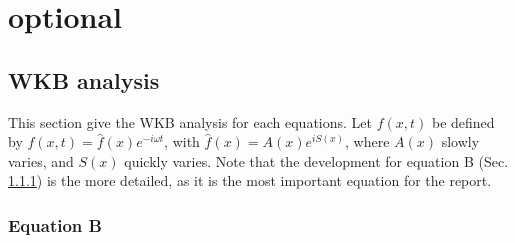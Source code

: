\documentclass[a4paper,12pt,twoside]{article}
\begin{document}
\newpage

\section{optional}
  \subsection{WKB analysis}\label{sec:WKB}
    This section give the WKB analysis for each equations.
    Let $f(x,t)$ be defined by $f(x,t) = \hat{f}(x)e^{-i\omega t}$, with $\hat{f}(x) = A(x)e^{iS(x)}$, where $A(x)$ slowly varies, and $S(x)$ quickly varies.
    Note that the development for equation B (Sec. \ref{sec:WKB-B}) is the more detailed, as it is the most important equation for the report.

    \subsubsection{Equation B}\label{sec:WKB-B}
\end{document}
